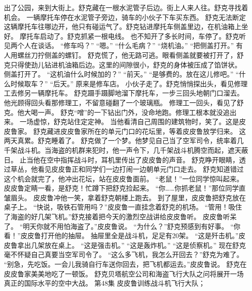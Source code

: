 \documentclass[a4paper,12pt,UTF8,twoside]{ctexbook}
\begin{document}
        出了公园，来到大街上。舒克藏在一根水泥管子后边。街上人来人往。舒克寻找着机会。 
        一辆摩托车停在水泥管子旁边，骑车的小伙子下车买东西。 
        舒克无法断定这辆摩托车往哪边开，他只有碰运气了。舒克钻进摩托车侧盖里边，在机油箱上坐好。 
        摩托车启动了。舒克抓紧一根电线。 
        也不知开了多长时间，车停了。舒克听见两个人在谈话。 
        “修车吗？” 
        “嗯。” 
        “什么毛病？” 
        “烧机油。” 
        “把侧盖打开。” 
        有人用螺丝刀拧侧盖的螺钉。 
        舒克慌了，他无路可逃。眼看侧盖就要被打开了，舒克只得使劲儿钻进机油箱后边。这里的间隙很小，舒克的身体被压成了馅饼状。 
        侧盖打开了。 
        “这机油什么时候加的？” 
        “前天。” 
        “是够费的。放在这儿修吧。” 
        “什么时候取车？” 
        “后天。” 
        原来是修车店。 
        小伙子走了。舒克悄悄探出头，看见修理工去修另一辆摩托车。 
        舒克蹑手蹑脚地溜下摩托车，一步三回头地朝门口溜去。他光顾得回头看那修理工，不留意碰翻了一个玻璃瓶。 
        修理工一回头，看见了舒克。他大喝一声。 
        舒克“噌”的一下钻出门外，没命地跑。修理工根本就没追出来。 
        一场虚惊，舒克站住定定神。 
        当他看清自己周围的建筑物时，笑了。这是皮皮鲁家。 
        舒克藏进皮皮鲁家所在的单元门口的花坛里，等着皮皮鲁放学归来。 
        这两天真累。舒克睡着了。 
        舒克做了一个梦。他梦见自己当了空军司令，统率着几千架战斗机。当海盗的机群来犯时，他一声令下，几千架战斗机腾空而起，遮天蔽日。 
        止当他在空中指挥战斗时，耳机里传出了皮皮鲁的声音。 
        舒克睁开眼睛，透过草丛，他看见皮皮鲁正和同学们一边打闹一边朝单元门口走去。 
        舒克知道错过这个机会就完了，他冲出花坛，站在皮皮鲁面前。 
        “老鼠！”一位同学惊叫起来。 
        皮皮鲁定睛一看，是舒克！忙蹲下把舒克捡起来。 
        “你……你抓老鼠！”那位同学直皱眉头。 
        皮皮鲁冲他一笑，拿着舒克朝楼上跑去。 
        到了屋里，皮皮鲁把舒克放在桌子上。 
        “快说，吸铁石管用吗？”皮皮鲁一直挂念着舒克的机场。 
        “管用！吸住了海盗的好几架飞机。”舒克接着把今天的激烈空战讲给皮皮鲁听。 
        皮皮鲁听呆了。 
        “明天你就不用怕海盗了。”皮皮鲁说。 
        “为什么？”舒克预感到有好事。 
        “你看！”皮皮鲁打开他的抽屉。 
        抽屉里全是战斗机，足足有20架。 
        “这是歼击机。”皮皮鲁拿出几架放在桌上。 
        “这是强击机。” 
        “这是轰炸机。” 
        “这是侦察机。” 
        现在舒克毫不怀疑自己真要当空军司令了。 
        “这么多飞机，我怎么开回去？”舒克为难了。 
        “别急，先吃饭。一会儿我骑自行车送你回去，把飞机都运去。”皮皮鲁说。 
        舒克在皮皮鲁家美美地吃了一顿饭。 
        舒克贝塔航空公司和海盗飞行大队之问将展开一场真正的国际水平的空中大战。   第48集 
        皮皮鲁训练战斗机飞行大队； 
\end{document}
